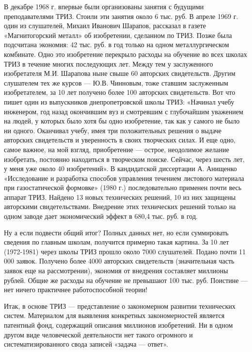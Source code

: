 В  декабре  1968  г.  впервые были  организованы  занятия  с  будущими
преподавателями ТРИЗ.  Стоили эти занятия  около 6 тыс. руб.  В апреле
1969  г. один  из  слушателей, Михаил  Иванович  Шарапов, рассказал  в
газете  «Магнитогорский металл»  об  изобретении,  сделанном по  ТРИЗ.
Позже была  подсчитана экономия: 42  тыс. руб.  в год только  на одном
металлургическом комбинате. Одно это  изобретение перекрыло расходы на
обучение  во  всех  школах  ТРИЗ в  течение  многих  последующих  лет.
Между  тем у  заслуженного изобретателя  М.И. Шарапова  ныне свыше  60
авторских  свидетельств.  Другим  слушателем  тех  же  курсов  —  Ю.В.
Чинновым, тоже  ставшим заслуженным изобретателем, за  10 лет получено
более 100  авторских свидетельств. Вот  что пишет один  из выпускников
днепропетровской  школы  ТРИЗ:  «Начинал учебу  инженером,  год  назад
окончившим  вуз  и смотревшим  с  глубочайшим  уважением на  людей,  у
которых было  хотя бы одно  изобретение, так как  у самого не  было ни
одного.  Оканчивал  учебу, имея  три  положительных  решения о  выдаче
авторских свидетельств и  уверенность в своих творческих  силах. И еще
одно, самое важное,  на мой взгляд, приобретение  — острое, неодолимое
желание изобретать, постоянно находиться  в творческом поиске. Сейчас,
через  шесть лет,  у меня  уже около  40 изобретений».  В кандидатской
диссертации А. Анищенко «Исследование и разработка способов управления
течением листового  материала при газостатической формовке»  (1980 г.)
последовательно  применен почти  весь аппарат  ТРИЗ. Найдено  13 новых
технических решений,  10 из  них защищены  авторскими свидетельствами.
Внедрение  этих  технических  решений  только  на  одном  заводе  дает
экономический эффект в 680,4 тыс. руб. в год.

Ну а если подвести общий итог?  Полных данных нет, но если суммировать
сведения по  главным школам, получится  примерно такая картина.  За 10
лет (1972-1981) через школы ТРИЗ  прошло около 7000 слушателей. Подано
почти  11  000  заявок.  Получено более  4000  авторских  свидетельств
(значительная часть заявок еще на рассмотрении), экономия от внедрения
составляет миллионы рублей. Общие же  расходы на обучение не превышают
100 тыс. руб. Поистине — нет ничего практичнее работоспособной теории!


Итак,  в   основе  ТРИЗ   —  представление  о   закономерном  развитии
технических    систем.    Материалом    для    выявления    конкретных
закономерностей является патентный фонд, содержащий описания миллионов
изобретений.  Ни в  одном  другом виде  человеческой деятельности  нет
такого  огромного  и  систематизированного  свода  записей  «задача  —
ответ».

